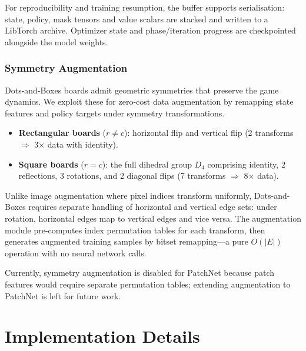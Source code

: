 \documentclass[11pt]{article}
\begin{document}
For reproducibility and training resumption, the buffer supports
serialisation: state, policy, mask tensors and value scalars are stacked
and written to a LibTorch archive. Optimizer state and phase/iteration
progress are checkpointed alongside the model weights.

\subsubsection{Symmetry Augmentation}
\label{sec:symmetry}

Dots-and-Boxes boards admit geometric symmetries that preserve the game
dynamics. We exploit these for zero-cost data augmentation by remapping
state features and policy targets under symmetry transformations.

\begin{itemize}
  \item \textbf{Rectangular boards} ($r \ne c$): horizontal flip and
    vertical flip (2 transforms $\Rightarrow$ 3$\times$ data with identity).
  \item \textbf{Square boards} ($r = c$): the full dihedral group $D_4$
    comprising identity, 2 reflections, 3 rotations, and 2 diagonal
    flips (7 transforms $\Rightarrow$ 8$\times$ data).
\end{itemize}

Unlike image augmentation where pixel indices transform uniformly,
Dots-and-Boxes requires separate handling of horizontal and vertical
edge sets: under rotation, horizontal edges map to vertical edges and
vice versa. The augmentation module pre-computes index permutation
tables for each transform, then generates augmented training samples
by bitset remapping---a pure $O(|E|)$ operation with no neural network
calls.

Currently, symmetry augmentation is disabled for PatchNet because
patch features would require separate permutation tables; extending
augmentation to PatchNet is left for future work.

\section{Implementation Details}
\label{sec:implementation}
\end{document}
